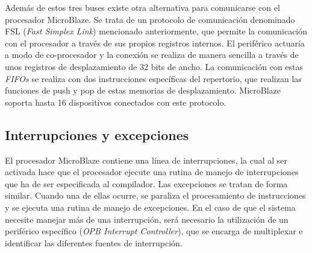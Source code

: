 Además de estos tres buses existe otra alternativa para comunicarse con el
procesador MicroBlaze. Se trata de un protocolo de comunicación denominado FSL
(\emph{Fast Simplex Link}) mencionado anteriormente, que permite la comunicación
con el procesador a través de sus propios registros internos. El periférico
actuaría a modo de co-procesador y la conexión se realiza de manera sencilla a
través de unos registros de desplazamiento de 32 bits de ancho. La comunicación
con estas \emph{FIFOs} se realiza con dos instrucciones específicas del
repertorio, que realizan las funciones de push y pop de estas memorias de
desplazamiento. MicroBlaze soporta hasta 16 dispositivos conectados con este
protocolo.


\subsection{Interrupciones y excepciones}

El procesador MicroBlaze contiene una línea de interrupciones, la cual al ser
activada hace que el procesador ejecute una rutina de manejo de interrupciones
que ha de ser especificada al compilador. Las excepciones se tratan de forma
similar. Cuando una de ellas ocurre, se paraliza el procesamiento de
instrucciones y se ejecuta una rutina de manejo de excepciones. En el caso de
que el sistema necesite manejar más de una interrupción, será necesario la
utilización de un periférico específico (\emph{OPB Interrupt Controller}), que
se encarga de multiplexar e identificar las diferentes fuentes de
interrupción\cite{microblaze}.

















